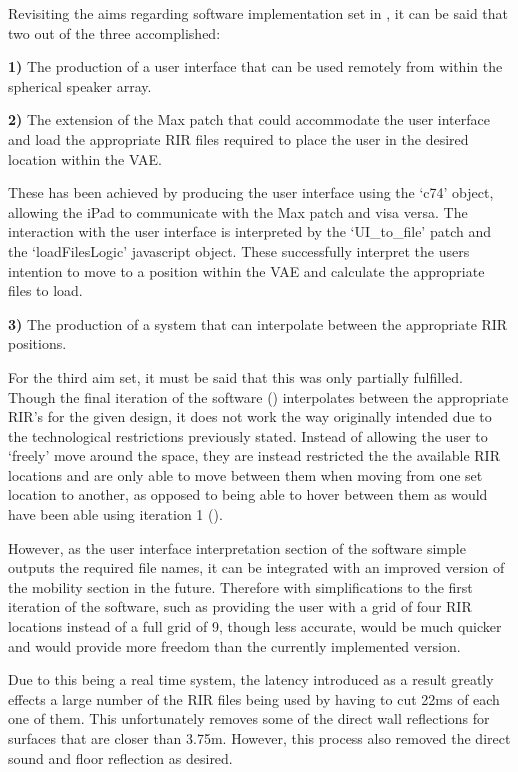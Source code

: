 \documentclass[../../main.tex]{subfiles}
\begin{document}
		Revisiting the aims regarding software implementation set in , it can be said that two out of the three accomplished:

		\textbf{1)} The production of a user interface that can be used remotely from within the spherical speaker array. 

		\textbf{2)} The extension of the Max patch that could accommodate the user interface and load the appropriate \ac{RIR} files required to place the user in the desired location within the \ac{VAE}. 

		These has been achieved by producing the user interface using the `c74' object, allowing the iPad to communicate with the Max patch and visa versa. The interaction with the user interface is interpreted by the `UI\_to\_file' patch and the `loadFilesLogic' javascript object. These successfully interpret the users intention to move to a position within the \ac{VAE} and calculate the appropriate files to load.
 
 		\textbf{3)} The production of a system that can interpolate between the appropriate \ac{RIR} positions.

 		For the third aim set, it must be said that this was only partially fulfilled. Though the final iteration of the software () interpolates between the appropriate \ac{RIR}'s for the given design, it does not work the way originally intended due to the technological restrictions previously stated. Instead of allowing the user to `freely' move around the space, they are instead restricted the the available \ac{RIR} locations and are only able to move between them when moving from one set location to another, as opposed to being able to hover between them as would have been able using iteration 1 ().

 		However, as the user interface interpretation section of the software simple outputs the required file names, it can be integrated with an improved version of the mobility section in the future. Therefore with simplifications to the first iteration of the software, such as providing the user with a grid of four \ac{RIR} locations instead of a full grid of 9, though less accurate, would be much quicker and would provide more freedom than the currently implemented version.

		Due to this being a real time system, the latency introduced as a result greatly effects a large number of the \ac{RIR} files being used by having to cut 22ms of each one of them. This unfortunately removes some of the direct wall reflections for surfaces that are closer than 3.75m. However, this process also removed the direct sound and floor reflection as desired.




		
\end{document}

